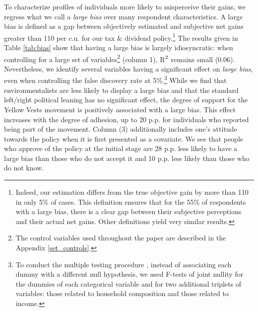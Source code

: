 \documentclass[12pt]{article} %
\begin{document}
To characterize profiles of individuals more likely to misperceive their gains, we regress what we call a \textit{large bias} over many respondent characteristics. A large bias is defined as a gap between objectively estimated and subjective net gains greater than 110\euros{} per c.u. for our tax \& dividend policy.\footnote{Indeed, our estimation differs from the true objective gain by more than 110\euros{} in only 5\% of cases. This definition ensures that for the 55\% of respondents with a large bias, there is a clear gap between their subjective perceptions and their actual net gains. Other definitions yield very similar results.} The results given in Table \ref{tab:bias} show that having a large bias is largely idiosyncratic: when controlling for a large set of variables\footnote{The control variables used throughout the paper are described in the Appendix \ref{set_controls}.} (column 1), R$^\textnormal{2}$ remains small (0.06). Nevertheless, we identify several variables having a significant effect on \textit{large bias}, even when controlling the false discovery rate at 5\%.\footnote{To conduct the multiple testing procedure \citep[following][]{benjamini_controlling_1995}, instead of associating each dummy with a different null hypothesis, we used F-tests of joint nullity for the dummies of each categorical variable and for two additional triplets of variables: those related to household composition and those related to income.} While we find that environmentalists are less likely to display a large bias and that the standard left/right political leaning has no significant effect, the degree of support for the Yellow Vests movement is positively associated with a large bias. This effect increases with the degree of adhesion, up to 20 p.p. for individuals who reported being part of the movement. Column (3) additionally includes one's attitude towards the policy when it is first presented as a covariate. We see that people who approve of the policy at the initial stage are 28 p.p. less likely to have a large bias than those who do not accept it and 10 p.p. less likely than those who do not know.
\end{document}
